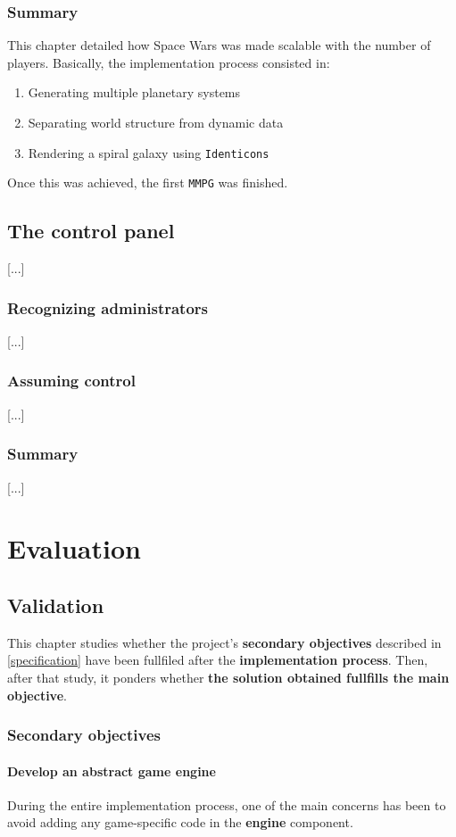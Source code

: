 \documentclass[a4paper,11pt,titlepage,abstract,numbers=noenddot,automark,mnsy,intlimits,rgb,dvipsnames]{report}
\begin{document}
\section{Summary}
This chapter detailed how Space Wars was made scalable with the number of players. Basically, the implementation
process consisted in:
\begin{enumerate}
\item
Generating multiple planetary systems
\item
Separating world structure from dynamic data
\item
Rendering a spiral galaxy using \texttt{Identicons}
\end{enumerate}
Once this was achieved, the first \texttt{MMPG} was finished.
\chapter{The control panel}
\label{control_panel}
[...]
\section{Recognizing administrators}
[...]
\section{Assuming control}
[...]
\section{Summary}
[...]
\part{Evaluation}
\chapter{Validation}
\label{validation}
This chapter studies whether the project's \textbf{secondary objectives} described in \autoref{specification}
have been fullfiled after the \textbf{implementation process}. Then, after that study, it ponders whether
\textbf{the solution obtained fullfills the main objective}.
\section{Secondary objectives}
\subsection{Develop an abstract game engine}
During the entire implementation process, one of the main concerns has been to avoid adding any game-specific code
in the \textbf{engine} component.
\end{document}
